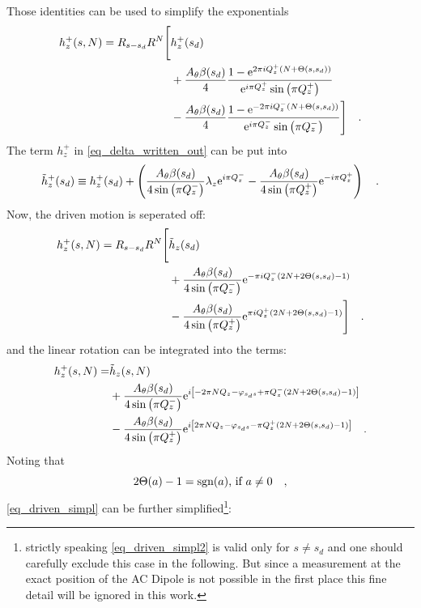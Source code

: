 %
Those identities can be used to simplify the exponentials
%
\begin{align}
    h_z^+(s, N) = R_{s-s_d}R^N 
    \Bigg[&h_z^+(s_d)  \notag \\
        &+ \frac{A_\theta\beta(s_d)}{4}\frac{1-\text{e}^{2\pi i Q_z^+(N+\Theta(s,s_d))}}{\text{e}^{i\pi Q_z^+}\sin\left( \pi Q_z^+ \right)}  \notag \\
        &- \frac{A_\theta\beta(s_d)}{4}\frac{1-\text{e}^{-2\pi i Q_z^-(N+\Theta(s,s_d))}}{\text{e}^{i\pi Q_z^-}\sin\left( \pi Q_z^- \right)}
    \Bigg]
    \quad .
    \label{eq_delta_written_out}
\end{align}
%
The term $h_z^+$ in \eqref{eq_delta_written_out} can be put into 
%
\begin{equation}
    \tilde{h}_z^+(s_d) \equiv h_z^+(s_d) + 
    \left(
    \frac{A_\theta\beta(s_d)}{4\sin\left( \pi Q_z^-\right)}\lambda_z \text{e}^{i \pi Q_z^-}
    -\frac{A_\theta\beta(s_d)}{4\sin\left( \pi Q_z^+\right)} \text{e}^{-i\pi Q_z^+}
    \right)
    \quad .
\end{equation}
%
Now, the driven motion is seperated off:
%
\begin{align}
    h_z^+(s, N) = R_{s-s_d}R^N 
    \Bigg[&\tilde{h}_z(s_d) 
    \notag \\
        &+ \frac{A_\theta\beta(s_d)}{4\sin\left( \pi Q_z^-\right)} \text{e}^{-\pi i Q_z^-(2N+2\Theta(s,s_d)-1)} 
         \notag \\
        &- \frac{A_\theta\beta(s_d)}{4\sin\left( \pi Q_z^+\right)} \text{e}^{\pi i Q_z^+(2N+2\Theta(s,s_d) -1)}
    \Bigg]
    \quad .
    \label{eq_driven_simpl_R}
\end{align}
%
and the linear rotation can be integrated into the terms:
%
\begin{align}
    h_z^+(s, N) =
        &\tilde{h}_z(s, N) \notag \\
        &+\frac{A_\theta\beta(s_d)}{4\sin\left( \pi Q_z^-\right)}
        \text{e}^{i\left[-2\pi NQ_{z} - \varphi_{s_ds} + \pi Q_z^-(2N+2\Theta(s,s_d)-1)\right]}
        \notag\\
        &-\frac{A_\theta\beta(s_d)}{4\sin\left( \pi Q_z^+\right)}
        \text{e}^{i\left[2\pi NQ_{z} - \varphi_{s_ds}- \pi Q_z^+(2N + 2\Theta(s,s_d) -1)\right]}
    \quad .
    \label{eq_driven_simpl}
\end{align}
%
Noting that
%
\begin{equation}
  2\Theta(a) - 1 = \text{sgn}(a) \text{, if } a \neq 0
    \quad ,
\end{equation}
%
\eqref{eq_driven_simpl} can be further simplified\footnote{
    strictly speaking \eqref{eq_driven_simpl2} is valid only for $s\neq s_d$ and one should carefully exclude this case
    in the following. But since a measurement at the exact position of the AC Dipole is not possible in the first place
    this fine detail will be ignored in this work.
    }:
